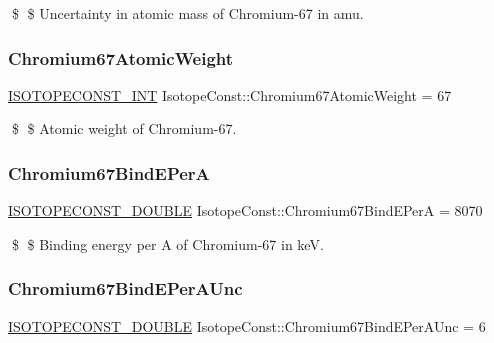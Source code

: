 \$ \$ Uncertainty in atomic mass of Chromium-\/67 in amu. \mbox{\label{group___isotope_const-_chromium-_cr67_ga22575eecc8a73bc46a26c218af7e0134}} 
\subsubsection{\texorpdfstring{Chromium67\+Atomic\+Weight}{Chromium67AtomicWeight}}
{\footnotesize\ttfamily \mbox{\hyperlink{group___isotope_const-_macros_ga5f18360b3e99483a35c32d789e62621c}{I\+S\+O\+T\+O\+P\+E\+C\+O\+N\+S\+T\+\_\+\+I\+NT}} Isotope\+Const\+::\+Chromium67\+Atomic\+Weight = 67}

\$ \$ Atomic weight of Chromium-\/67. \mbox{\label{group___isotope_const-_chromium-_cr67_gae00cd936eb6c5313eadf36813279bd8e}} 
\subsubsection{\texorpdfstring{Chromium67\+Bind\+E\+PerA}{Chromium67BindEPerA}}
{\footnotesize\ttfamily \mbox{\hyperlink{group___isotope_const-_macros_ga8f45a7272ce02c0b4c65c44636ed719a}{I\+S\+O\+T\+O\+P\+E\+C\+O\+N\+S\+T\+\_\+\+D\+O\+U\+B\+LE}} Isotope\+Const\+::\+Chromium67\+Bind\+E\+PerA = 8070}

\$ \$ Binding energy per A of Chromium-\/67 in keV. \mbox{\label{group___isotope_const-_chromium-_cr67_ga0e28882f759fa0d884ff01ea9bb2e26b}} 
\subsubsection{\texorpdfstring{Chromium67\+Bind\+E\+Per\+A\+Unc}{Chromium67BindEPerAUnc}}
{\footnotesize\ttfamily \mbox{\hyperlink{group___isotope_const-_macros_ga8f45a7272ce02c0b4c65c44636ed719a}{I\+S\+O\+T\+O\+P\+E\+C\+O\+N\+S\+T\+\_\+\+D\+O\+U\+B\+LE}} Isotope\+Const\+::\+Chromium67\+Bind\+E\+Per\+A\+Unc = 6}

